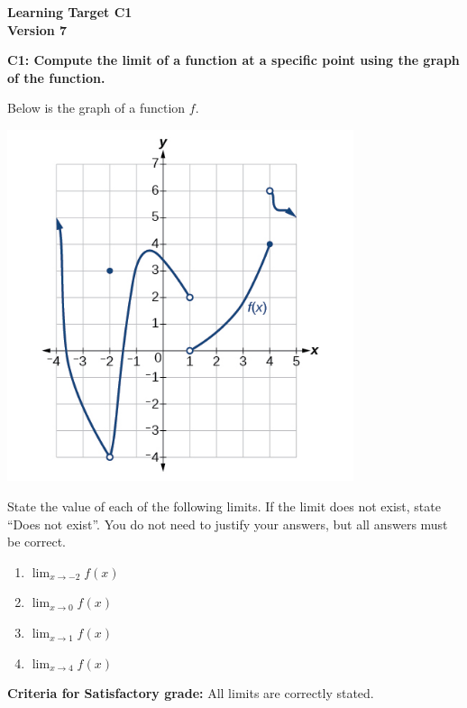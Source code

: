 \documentclass[10pt]{article}
\begin{document}
	\vspace*{0in}

		\begin{center}
			\textbf{Learning Target C1 \\
			Version 7} \\
		\end{center}


\begin{framed}
	\textbf{C1: Compute the limit of a function at a specific point using the graph of the function. }
\end{framed}

Below is the graph of a function $f$. 

\begin{center}
    \includegraphics[width=4in]{c1-final.jpg}
\end{center}

State the value of each of the following limits. If the limit does not exist, state ``Does not exist''. You do not need to justify your answers, but all answers must be correct. 

\begin{enumerate}
    \item $\displaystyle{\lim_{x \to -2} f(x)}$
    \item $\displaystyle{\lim_{x \to 0} f(x)}$
    \item $\displaystyle{\lim_{x \to 1} f(x)}$
    \item $\displaystyle{\lim_{x \to 4} f(x)}$
\end{enumerate}


\vfill


\begin{small}
    \begin{framed}
        	\textbf{Criteria for Satisfactory grade:} All limits are correctly stated.
    \end{framed}

\end{small}
\end{document}
